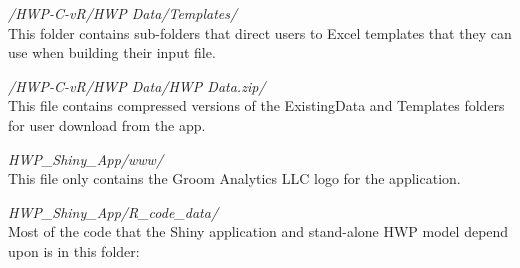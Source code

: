 \documentclass[
  openany]{book}
\begin{document}
\emph{/HWP-C-vR/HWP Data/Templates/}\\
This folder contains sub-folders that direct users to Excel templates
that they can use when building their input file.

\emph{/HWP-C-vR/HWP Data/HWP Data.zip/}\\
This file contains compressed versions of the ExistingData and Templates
folders for user download from the app.

\emph{HWP\_Shiny\_App/www/}\\
This file only contains the Groom Analytics LLC logo for the
application.

\emph{HWP\_Shiny\_App/R\_code\_data/}\\
Most of the code that the Shiny application and stand-alone HWP model
depend upon is in this folder:
\end{document}
